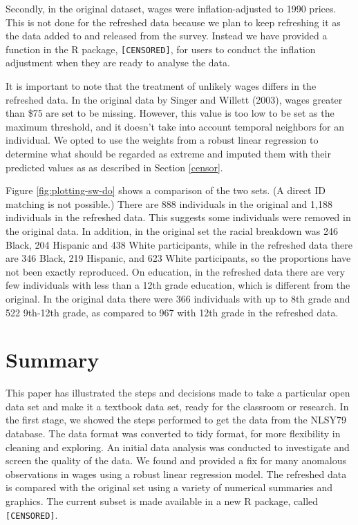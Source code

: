 \documentclass{article}
\begin{document}
Secondly, in the original dataset, wages were inflation-adjusted to 1990 prices. This is not done for the refreshed data because we plan to keep refreshing it as the data added to and released from the survey. Instead we have provided a function in the R package, \texttt{[CENSORED]}, for users to conduct the inflation adjustment when they are ready to analyse the data.

It is important to note that the treatment of unlikely wages differs in the refreshed data. In the original data by Singer and Willett (2003), wages greater than \$75 are set to be missing. However, this value is too low to be set as the maximum threshold, and it doesn't take into account temporal neighbors for an individual. We opted to use the weights from a robust linear regression to determine what should be regarded as extreme and imputed them with their predicted values as as described in Section \ref{censor}.

Figure \ref{fig:plotting-sw-do} shows a comparison of the two sets. (A direct ID matching is not possible.) There are 888 individuals in the original and 1,188 individuals in the refreshed data. This suggests some individuals were removed in the original data.
In addition, in the original set the racial breakdown was 246 Black, 204 Hispanic and 438 White participants, while in the refreshed data there are 346 Black, 219 Hispanic, and 623 White participants, so the proportions have not been exactly reproduced. On education, in the refreshed data there are very few individuals with less than a 12th grade education, which is different from the original. In the original data there were 366 individuals with up to 8th grade and 522 9th-12th grade, as compared to 967 with 12th grade in the refreshed data.

\hypertarget{summary}{%
\section{Summary}\label{summary}}

This paper has illustrated the steps and decisions made to take a particular open data set and make it a textbook data set, ready for the classroom or research. In the first stage, we showed the steps performed to get the data from the NLSY79 database. The data format was converted to tidy format, for more flexibility in cleaning and exploring. An initial data analysis was conducted to investigate and screen the quality of the data. We found and provided a fix for many anomalous observations in wages using a robust linear regression model. The refreshed data is compared with the original set using a variety of numerical summaries and graphics. The current subset is made available in a new R package, called \texttt{[CENSORED]}.
\end{document}
